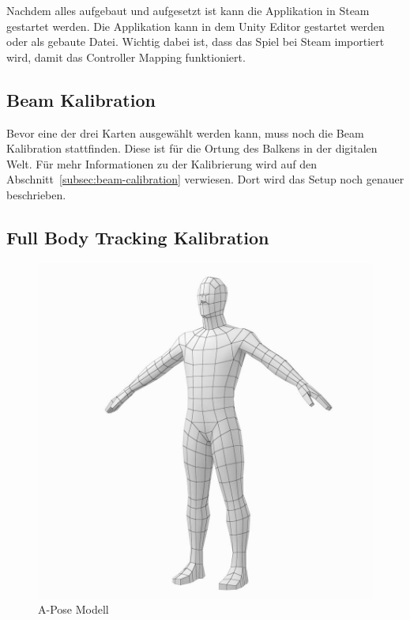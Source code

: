 Nachdem alles aufgebaut und aufgesetzt ist kann die Applikation in Steam gestartet werden.
Die Applikation kann in dem Unity Editor gestartet werden oder als gebaute Datei.
Wichtig dabei ist, dass das Spiel bei Steam importiert wird, damit das Controller Mapping funktioniert.

\subsection{Beam Kalibration}

Bevor eine der drei Karten ausgewählt werden kann, muss noch die Beam Kalibration stattfinden.
Diese ist für die Ortung des Balkens in der digitalen Welt.
Für mehr Informationen zu der Kalibrierung wird auf den Abschnitt~\ref{subsec:beam-calibration} verwiesen.
Dort wird das Setup noch genauer beschrieben.

\subsection{Full Body Tracking Kalibration}

\begin{figure}
    \centering
    \includegraphics[scale=0.3]{pics/a-pose-human}
    \caption{A-Pose Modell~\cite{vkstudio_2020}}
    \label{fig:a-pose-human}
\end{figure}

